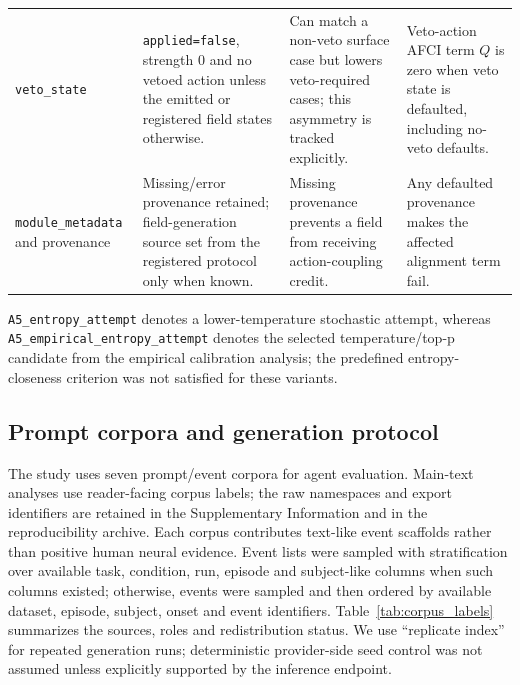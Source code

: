 ﻿\documentclass[preprint,12pt,authoryear]{elsarticle}
\begin{document}
\begin{table}[!htbp]
{\begin{tabular}{p{}p{}p{}p{}}
\texttt{veto\_state} & \texttt{applied=false}, strength 0 and no vetoed action unless the emitted or registered field states otherwise. & Can match a non-veto surface case but lowers veto-required cases; this asymmetry is tracked explicitly. & Veto-action AFCI term \(Q\) is zero when veto state is defaulted, including no-veto defaults. \\
\texttt{module\_metadata} and provenance & Missing/error provenance retained; field-generation source set from the registered protocol only when known. & Missing provenance prevents a field from receiving action-coupling credit. & Any defaulted provenance makes the affected alignment term fail. \\
\bottomrule
\end{tabular}%
}
\end{table}

\texttt{A5\_entropy\_attempt} denotes a lower-temperature stochastic attempt, whereas \texttt{A5\_empirical\_entropy\_attempt} denotes the selected temperature/top-p candidate from the empirical calibration analysis; the predefined entropy-closeness criterion was not satisfied for these variants.

\subsection{Prompt corpora and generation protocol}

The study uses seven prompt/event corpora for agent evaluation. Main-text analyses use reader-facing corpus labels; the raw namespaces and export identifiers are retained in the Supplementary Information and in the reproducibility archive. Each corpus contributes text-like event scaffolds rather than positive human neural evidence. Event lists were sampled with stratification over available task, condition, run, episode and subject-like columns when such columns existed; otherwise, events were sampled and then ordered by available dataset, episode, subject, onset and event identifiers. Table~\ref{tab:corpus_labels} summarizes the sources, roles and redistribution status. We use ``replicate index'' for repeated generation runs; deterministic provider-side seed control was not assumed unless explicitly supported by the inference endpoint.
\end{document}
